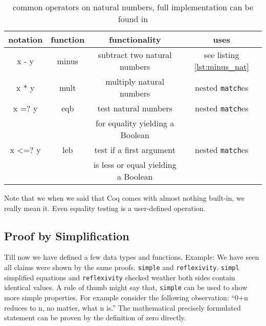 	   \begin{table}   
	   \begin{tabular}{|c|c|c|c|}
	     \hline 
	 	  notation      & function        & functionality                       & uses           \\  \hline
	 	  x - y         & minus           & subtract two natural numbers        & see listing  \ref{lst:minus_nat} \\  \hline
	      x * y         & mult            & multiply natural numbers            & nested \lstinline!match!es \\  \hline   
	   	  x =? y        & eqb             & test natural numbers                & nested \lstinline!match!es \\  
	  	                &                 & for equality yielding a Boolean     &                \\  \hline
	   	  x <=? y       & leb             & test if a first argument            & nested \lstinline!match!es \\  
	   	                &                 & is less or equal yielding a Boolean &                \\  \hline
	   \end{tabular}
	   \caption{common operators on natural numbers, full implementation can be found in \cite[section: Basics, Functional Programming in Coq: Numbers]{PACGGHSY}}
	   \label{tab:operators}	   
	   \end{table}   
	   
		Note that we when we said that Coq comes with almost nothing built-in, we really mean it.
	    Even equality testing is a user-defined operation.
	    
	   \subsection{Proof by Simplification}
	   
	   Till now we have defined a few data types and functions.
	   Example: We have seen all claims were shown by the same proofs. \lstinline!simple! and \lstinline!reflexivity!. 
	   \lstinline!simpl! simplified equations and \lstinline!reflexivity! checked weather both sides contain identical values.
	   A rule of thumb might say that, \lstinline!simple! can be used to show more simple properties.
	   For example consider the following observation: ``0+n reduces to n, no matter, what n is.''
	   The mathematical precisely formulated statement can be proven by the definition of zero directly.
	   
